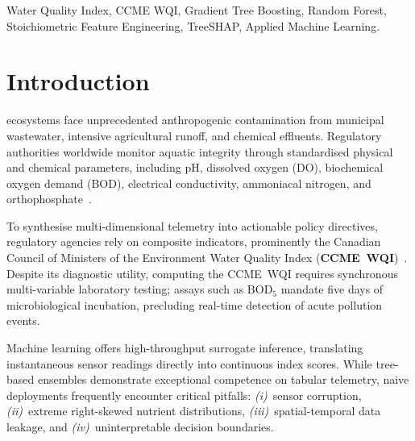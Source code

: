 \documentclass[conference]{IEEEtran}
\begin{document}
\begin{IEEEkeywords}
Water Quality Index, CCME WQI, Gradient Tree Boosting, Random Forest,
Stoichiometric Feature Engineering, TreeSHAP, Applied Machine Learning.
\end{IEEEkeywords}

\section{Introduction}
\label{sec:intro}

 ecosystems face unprecedented anthropogenic
contamination from municipal wastewater, intensive agricultural runoff,
and chemical effluents. Regulatory authorities worldwide monitor
aquatic integrity through standardised physical and chemical
parameters, including pH, dissolved oxygen (DO), biochemical oxygen
demand (BOD), electrical conductivity, ammoniacal nitrogen, and
orthophosphate~\cite{tyree2019surface}.

To synthesise multi-dimensional telemetry into actionable policy
directives, regulatory agencies rely on composite indicators,
prominently the Canadian Council of Ministers of the Environment Water
Quality Index (\textbf{CCME~WQI})~\cite{ccme2001wqi}. Despite its
diagnostic utility, computing the CCME~WQI requires synchronous
multi-variable laboratory testing; assays such as $\text{BOD}_5$
mandate five days of microbiological incubation, precluding real-time
detection of acute pollution events.

Machine learning offers high-throughput surrogate inference,
translating instantaneous sensor readings directly into continuous
index scores. While tree-based ensembles demonstrate exceptional
competence on tabular telemetry, naive deployments frequently encounter
critical pitfalls: \emph{(i)}~sensor corruption, \emph{(ii)}~extreme
right-skewed nutrient distributions, \emph{(iii)}~spatial-temporal data
leakage, and \emph{(iv)}~uninterpretable decision boundaries.
\end{document}

